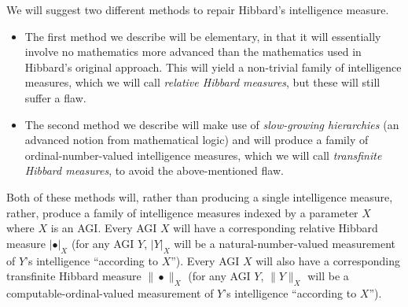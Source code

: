 \documentclass{article}
\begin{document}
We will suggest two different methods to repair Hibbard's intelligence measure.
\begin{itemize}
    \item
    The first method we describe will be elementary, in that it will
    essentially involve
    no mathematics more advanced than the mathematics used in Hibbard's original approach.
    This will yield a non-trivial family of intelligence measures,
    which we will call \emph{relative Hibbard measures}, but these will still suffer a flaw.
    \item
    The second method we describe will make use of \emph{slow-growing hierarchies}
    \cite{weiermann2002slow} (an advanced notion from mathematical logic) and will
    produce a family of ordinal-number-valued intelligence measures, which we will
    call \emph{transfinite Hibbard measures}, to avoid the above-mentioned flaw.
\end{itemize}
Both of these methods will, rather than producing a single intelligence measure,
rather, produce a family of intelligence measures indexed by a parameter $X$ where
$X$ is an AGI.
Every AGI $X$ will have a corresponding relative Hibbard measure $|\bullet|_X$
(for any AGI $Y$, $|Y|_X$ will be a natural-number-valued measurement of $Y$'s intelligence
``according to $X$'').
Every AGI $X$ will also have a corresponding transfinite Hibbard measure
$\|\bullet\|_X$
(for any AGI $Y$, $\|Y\|_X$ will be a computable-ordinal-valued measurement of $Y$'s
intelligence ``according to $X$'').
\end{document}
